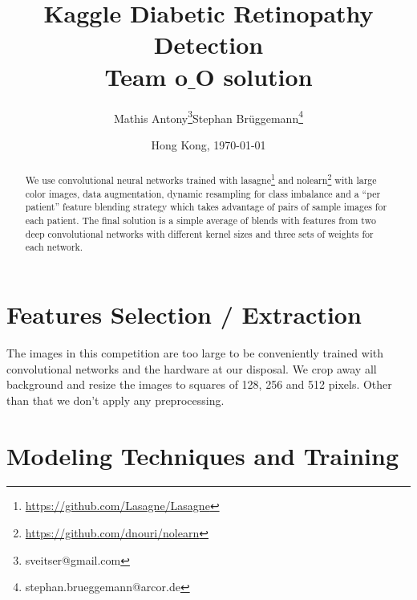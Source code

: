 \documentclass[12pt,a4paper]{scrartcl}
\title{Kaggle Diabetic Retinopathy Detection\\Team o$\_$O solution}
\author{Mathis Antony\thanks{sveitser@gmail.com}\quad Stephan Brüggemann\thanks{stephan.brueggemann@arcor.de}}
\date{Hong Kong, \today}
\begin{document}
\maketitle

\begin{abstract}
We use convolutional neural networks trained with lasagne\footnote{\url{https://github.com/Lasagne/Lasagne}} and nolearn\footnote{\url{https://github.com/dnouri/nolearn}} with large color images, data augmentation, dynamic resampling for class imbalance and a ``per patient'' feature blending strategy which takes advantage of pairs of sample images for each patient. The final solution is a simple average of blends with features from two deep convolutional networks with different kernel sizes and three sets of weights for each network.
\end{abstract}

\section{Features Selection / Extraction}
The images in this competition are too large to be conveniently trained with convolutional networks and the hardware at our disposal. We crop away all background and resize the images to squares of 128, 256 and 512 pixels. Other than that we don't apply any preprocessing.
\section{Modeling Techniques and Training}
\end{document}
